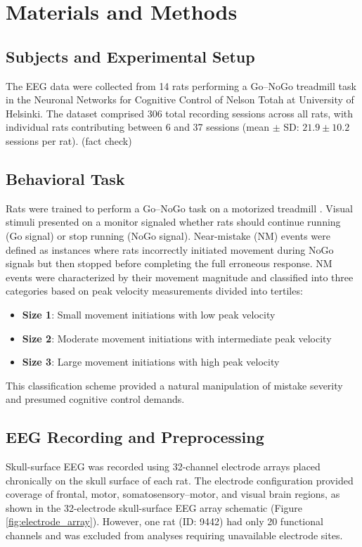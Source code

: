 \documentclass[11pt]{article}
\begin{document}
\section{Materials and Methods}

\subsection{Subjects and Experimental Setup}

The EEG data were collected from 14 rats performing a Go–NoGo treadmill task in the Neuronal Networks for Cognitive Control of Nelson Totah at University of Helsinki. The dataset comprised 306 total recording sessions across all rats, with individual rats contributing between 6 and 37 sessions (mean $\pm$ SD: $21.9 \pm 10.2$ sessions per rat). (fact check)

\subsection{Behavioral Task}

Rats were trained to perform a Go–NoGo task on a motorized treadmill \citep{doutel2024volitional}. Visual stimuli presented on a monitor signaled whether rats should continue running (Go signal) or stop running (NoGo signal). Near-mistake (NM) events were defined as instances where rats incorrectly initiated movement during NoGo signals but then stopped before completing the full erroneous response. 
NM events were characterized by their movement magnitude and classified into three categories based on peak velocity measurements divided into tertiles:
\begin{itemize}
\item \textbf{Size 1}: Small movement initiations with low peak velocity
\item \textbf{Size 2}: Moderate movement initiations with intermediate peak velocity
\item \textbf{Size 3}: Large movement initiations with high peak velocity
\end{itemize}

This classification scheme provided a natural manipulation of mistake severity and presumed cognitive control demands.

\subsection{EEG Recording and Preprocessing}

Skull-surface EEG was recorded using 32-channel electrode arrays placed chronically on the skull surface of each rat. The electrode configuration provided coverage of frontal, motor, somatosensory–motor, and visual brain regions, as shown in the 32-electrode skull-surface EEG array schematic (Figure \ref{fig:electrode_array}). However, one rat (ID: 9442) had only 20 functional channels and was excluded from analyses requiring unavailable electrode sites.
\end{document}
